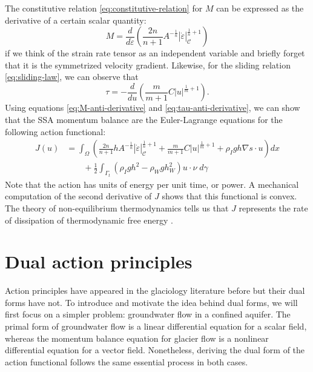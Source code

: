 \documentclass{article}
\theoremstyle{definition}
\theoremstyle{plain}
\begin{document}
The constitutive relation \eqref{eq:constitutive-relation} for $M$ can be expressed as the derivative of a certain scalar quantity:
\begin{equation}
    M = \frac{d}{d\dot\varepsilon}\left(\frac{2n}{n + 1}A^{-\frac{1}{n}}|\dot\varepsilon|_{\mathscr C}^{\frac{1}{n} + 1}\right)
    \label{eq:M-anti-derivative}
\end{equation}
if we think of the strain rate tensor as an independent variable and briefly forget that it is the symmetrized velocity gradient.
Likewise, for the sliding relation \eqref{eq:sliding-law}, we can observe that
\begin{equation}
    \tau = -\frac{d}{du}\left(\frac{m}{m + 1}C|u|^{\frac{1}{m} + 1}\right).
    \label{eq:tau-anti-derivative}
\end{equation}
Using equations \eqref{eq:M-anti-derivative} and \eqref{eq:tau-anti-derivative}, we can show that the SSA momentum balance are the Euler-Lagrange equations for the following action functional:
\begin{align}
    J(u) & = \int_\Omega\left(\frac{2n}{n + 1}hA^{-\frac{1}{n}}|\dot\varepsilon|_{\mathscr{C}}^{\frac{1}{n} + 1} + \frac{m}{m + 1}C|u|^{\frac{1}{m} + 1} + \rho_I gh\nabla s\cdot u\right)dx  \nonumber \\
    & \qquad + \frac{1}{2}\int_{\Gamma_t}\left(\rho_Igh^2 - \rho_Wgh_W^2\right)u\cdot\nu\; d\gamma
    \label{eq:ssa-primal-action}
\end{align}
Note that the action has units of energy per unit time, or power.
A mechanical computation of the second derivative of $J$ shows that this functional is convex.
The theory of non-equilibrium thermodynamics tells us that $J$ represents the rate of dissipation of thermodynamic free energy \citep{edelen1972nonlinear}.



\section{Dual action principles}

Action principles have appeared in the glaciology literature before but their dual forms have not.
To introduce and motivate the idea behind dual forms, we will first focus on a simpler problem: groundwater flow in a confined aquifer.
The primal form of groundwater flow is a linear differential equation for a scalar field, whereas the momentum balance equation for glacier flow is a nonlinear differential equation for a vector field.
Nonetheless, deriving the dual form of the action functional follows the same essential process in both cases.
\end{document}
